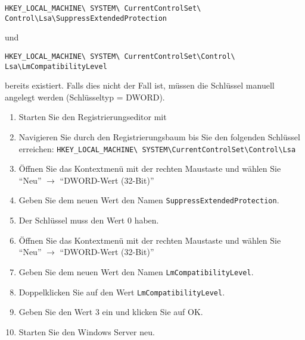           \begin{small}
            \texttt{HKEY\_LOCAL\_MACHINE\textbackslash
            SYSTEM\textbackslash
            CurrentControlSet\textbackslash
            Control\textbackslash Lsa\textbackslash SuppressExtendedProtection}
            
            und
            
            \texttt{HKEY\_LOCAL\_MACHINE\textbackslash
            SYSTEM\textbackslash
            CurrentControlSet\textbackslash Control\textbackslash
            Lsa\textbackslash LmCompatibilityLevel}
          \end{small}
          
          bereits existiert. Falls dies nicht der Fall ist, müssen die Schlüssel
          manuell angelegt werden (Schlüsseltyp = DWORD).
          \begin{enumerate}
            \item Starten Sie den Registrierungseditor mit
            \item Navigieren Sie durch den Registrierungsbaum bis Sie den
            folgenden Schlüssel
            erreichen: \texttt{HKEY\_LOCAL\_MACHINE\textbackslash
            SYSTEM\textbackslash CurrentControlSet\textbackslash Control\textbackslash Lsa}
            \item Öffnen Sie das Kontextmenü mit der rechten Maustaste und
            wählen Sie \enquote{Neu} $\rightarrow$ \enquote{DWORD-Wert (32-Bit)}
            \item Geben Sie dem neuen Wert den Namen
            \texttt{SuppressExtendedProtection}.
            \item Der Schlüssel muss den Wert 0 haben.
            \item Öffnen Sie das Kontextmenü mit der rechten Maustaste und
            wählen Sie \enquote{Neu} $\rightarrow$ \enquote{DWORD-Wert (32-Bit)}
            \item Geben Sie dem neuen Wert den Namen
            \texttt{LmCompatibilityLevel}.
            \item Doppelklicken Sie auf den Wert \texttt{LmCompatibilityLevel}. 
            \item Geben Sie den Wert 3 ein und klicken Sie auf OK.
            \item Starten Sie den Windows Server neu.
          \end{enumerate}
